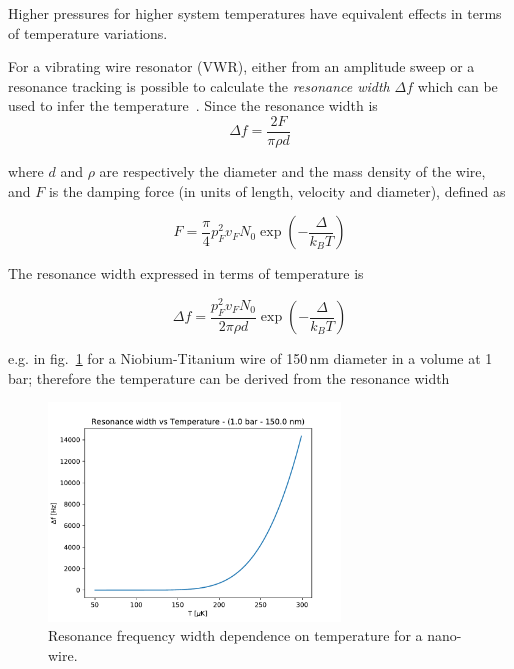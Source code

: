 \documentclass[a4paper,12pt]{article}
\begin{document}
Higher pressures for higher system temperatures have equivalent effects in terms of temperature variations.

For a vibrating wire resonator (VWR), either from an amplitude sweep or a resonance tracking is possible to calculate the \textit{resonance width} $\Delta f$ which can be used to infer the temperature~\cite{lawson}.
Since the resonance width is
\begin{equation}
\Delta f = \frac{2F}{\pi \rho d}
\end{equation}

where $d$ and $\rho$ are respectively the diameter and the mass density of the wire, and $F$ is the damping %
force (in units of length, velocity and diameter), defined as

\begin{equation}
F = \frac{\pi}{4}p^2_F v_F N_0 \exp{\left( -\frac{\varDelta}{k_B T} \right)}
\end{equation}

The resonance width expressed in terms of temperature is

\begin{equation}
  \Delta f = \frac{p^2_F v_F N_0}{2\pi\rho d}\exp{\left( -\frac{\varDelta}{k_B T} \right)}
  \label{eq:width}
\end{equation}

e.g. in fig.~\ref{fig:WvsT} for a Niobium-Titanium wire of 150\,nm diameter in a volume at 1\,bar; therefore the temperature can be derived from the resonance width

\begin{figure}[!ht]
  \begin{center}
    \includegraphics[width=0.69\textwidth]{W_vs_T}
    \caption{Resonance frequency width dependence on temperature for a nano-wire.}
    \label{fig:WvsT}
  \end{center}
\end{figure}
\end{document}

